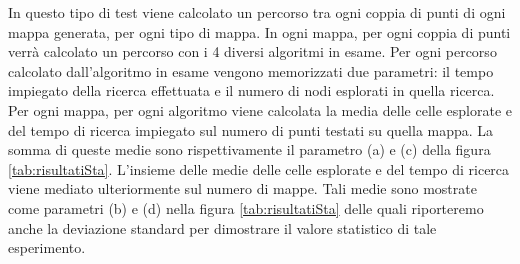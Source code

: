 \documentclass[11pt]{book}
\begin{document}
{In questo tipo di test viene calcolato un percorso tra ogni coppia di punti di ogni mappa generata, per ogni tipo di mappa. In ogni mappa, per ogni coppia di punti verr\`a calcolato un percorso con i 4 diversi algoritmi in esame. Per ogni percorso calcolato dall'algoritmo in esame vengono memorizzati due parametri: il tempo impiegato della ricerca effettuata e il numero di nodi esplorati in quella ricerca. Per ogni mappa, per ogni algoritmo viene calcolata la media delle celle esplorate e del tempo di ricerca impiegato sul numero di punti testati su quella mappa. La somma di queste medie sono rispettivamente il parametro (a) e (c) della figura \ref{tab:risultatiSta}. L'insieme delle medie delle celle esplorate e del tempo di ricerca viene mediato ulteriormente sul numero di mappe. Tali medie sono mostrate come parametri (b) e (d) nella figura \ref{tab:risultatiSta} delle quali riporteremo anche la deviazione standard per dimostrare il valore statistico di tale esperimento.

\begin{table}[H]
\caption {Risultati Stationary Target Test } \label{tab:risultatiSta} 
\centering

\end{table}}
\end{document}
